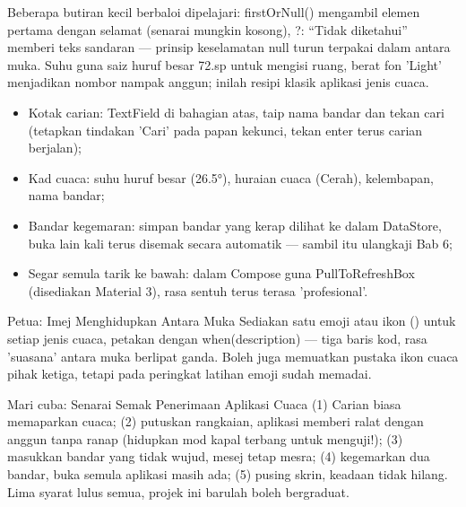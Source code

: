 Beberapa butiran kecil berbaloi dipelajari: firstOrNull() mengambil elemen pertama dengan selamat (senarai mungkin kosong), ?: “Tidak diketahui” memberi teks sandaran — prinsip keselamatan null turun terpakai dalam antara muka. Suhu guna saiz huruf besar 72.sp untuk mengisi ruang, berat fon 'Light' menjadikan nombor nampak anggun; inilah resipi klasik aplikasi jenis cuaca.



\begin{itemize}
  \item Kotak carian: TextField di bahagian atas, taip nama bandar dan tekan cari (tetapkan tindakan 'Cari' pada papan kekunci, tekan enter terus carian berjalan);
  \item Kad cuaca: suhu huruf besar (26.5°), huraian cuaca (Cerah), kelembapan, nama bandar;
  \item Bandar kegemaran: simpan bandar yang kerap dilihat ke dalam DataStore, buka lain kali terus disemak secara automatik — sambil itu ulangkaji Bab 6;
  \item Segar semula tarik ke bawah: dalam Compose guna PullToRefreshBox (disediakan Material 3), rasa sentuh terus terasa 'profesional'.
\end{itemize}

\begin{tcbinfo}{Petua: Imej Menghidupkan Antara Muka}
Sediakan satu emoji atau ikon () untuk setiap jenis cuaca, petakan dengan when(description) — tiga baris kod, rasa 'suasana' antara muka berlipat ganda. Boleh juga memuatkan pustaka ikon cuaca pihak ketiga, tetapi pada peringkat latihan emoji sudah memadai.

\end{tcbinfo}

\begin{tcbpractice}{Mari cuba: Senarai Semak Penerimaan Aplikasi Cuaca}
(1) Carian biasa memaparkan cuaca; (2) putuskan rangkaian, aplikasi memberi ralat dengan anggun tanpa ranap (hidupkan mod kapal terbang untuk menguji!); (3) masukkan bandar yang tidak wujud, mesej tetap mesra; (4) kegemarkan dua bandar, buka semula aplikasi masih ada; (5) pusing skrin, keadaan tidak hilang. Lima syarat lulus semua, projek ini barulah boleh bergraduat.

\end{tcbpractice}

